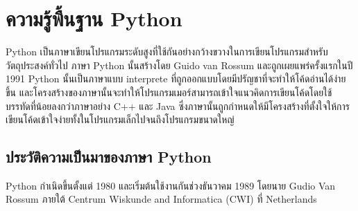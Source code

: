 	\section{ความรู้พื้นฐาน Python}
	Python \cite{py} เป็นภาษาเขียนโปรแกรมระดับสูงที่ใช้กันอย่างกว้างขวางในการเขียนโปรแกรมสำหรับวัตถุประสงค์ทั่วไป 
	ภาษา Python นั้นสร้างโดย Guido van Rossum และถูกเผยแพร่ครั้งแรกในปี 1991 Python 
	นั้นเป็นภาษาแบบ interprete ที่ถูกออกแบบโดยมีปรัญชาที่จะทำให้โค้ดอ่านได้ง่ายขึ้น
	 และโครงสร้างของภาษานั้นจะทำให้โปรแกรมเมอร์สามารถเข้าใจแนวคิดการเขียนโค้ดโดยใช้บรรทัดที่น้อยลงกว่าภาษาอย่าง 
	 C++ และ Java ซึ่งภาษานั้นถูกกำหนดให้มีโครงสร้างที่ตั้งใจให้การเขียนโค้ดเข้าใจง่ายทั้งในโปรแกรมเล็กไปจนถึงโปรแกรมขนาดใหญ่
	 
	\subsection{ประวัติความเป็นมาของภาษา Python}
	Python กำเนิดขึ้นตั้งแต่ 1980 
	และเริ่มต้นใช้งานกันช่วงธันวาคม 1989 โดยนาย
	Gudio Van Rossum
	 ภายใต้ Centrum Wiskunde and Informatica (CWI) ที่ Netherlands\cite{bpy}	
	

  

